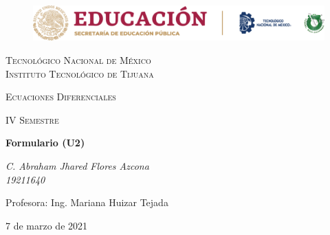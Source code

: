 \documentclass[letterpaper, 12pt]{article}
\begin{document}
    
    \begin{titlepage}
        \begin{figure}[ht]
            \centering
            \includegraphics[width=15cm]{logosITT.png}
        \end{figure}
        \centering
        {\scshape\LARGE Tecnológico Nacional de México\\Instituto Tecnológico de Tijuana\par}
        \vspace{1cm}
        {\scshape\Large Ecuaciones Diferenciales\par}
        \vspace{1cm}
        {\scshape\Large IV Semestre\par}
        \vspace{1.5cm}
        {\huge\bfseries Formulario (U2)\par}
        \vspace{2cm}
        {\Large\itshape C. Abraham Jhared Flores Azcona\\19211640\par}
        \vfill
        Profesora: Ing. Mariana Huizar Tejada\par
        
        \vfill

        {\large 7 de marzo de 2021}
    \end{titlepage}
\end{document}
